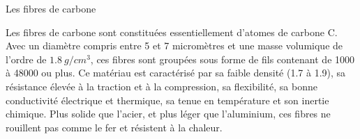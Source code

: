 \begin{doc}
	\label{doc:carbone}
	\caption{Les fibres de carbone}
	
	Les fibres de carbone sont constituées essentiellement d'atomes de carbone C. 
	Avec un diamètre compris entre 5 et 7 micromètres et une masse volumique de l'ordre de $\num{1.8} \: g/cm^3$, ces fibres sont groupées sous forme de fils contenant de \num{1000} à \num{48000} ou plus.
	Ce matériau est caractérisé par sa faible densité (\num{1.7} à \num{1.9}), sa résistance élevée à la traction et à la compression, sa flexibilité, sa bonne conductivité électrique et thermique, sa tenue en température et son inertie chimique.
	Plus solide que l'acier, et plus léger que l'aluminium, ces fibres ne rouillent pas comme le fer et résistent à la chaleur. 
\end{doc}